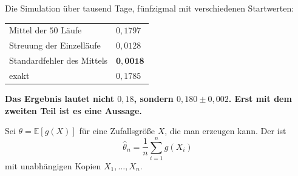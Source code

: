 \begin{merksatz}
Die Simulation über tausend Tage, fünfzigmal mit verschiedenen Startwerten:

\begin{center}
{\small
\renewcommand{\arraystretch}{1.5}
\begin{tabular}{@{}P{4.0cm}P{2.6cm}@{}}
\toprule
Mittel der $50$ Läufe & $0{,}1797$\\
Streuung der Einzelläufe & $0{,}0128$\\
Standardfehler des Mittels & $\mathbf{0{,}0018}$\\
\midrule
exakt & $0{,}1785$\\
\bottomrule
\end{tabular}}
\end{center}

\begin{center}
\begin{minipage}{0.9\textwidth}
\textbf{Das Ergebnis lautet nicht $0{,}18$, sondern $0{,}180 \pm 0{,}002$. Erst mit dem zweiten Teil ist es eine Aussage.}
\end{minipage}
\end{center}

\begin{center}
\begin{minipage}{0.88\textwidth}
\end{minipage}
\end{center}
\end{merksatz}

\begin{definition}
Sei $\theta = \mathbb{E}[g(X)]$ für eine Zufallsgröße $X$, die man erzeugen kann. Der  ist
\[ \hat\theta_n = \frac1n\sum_{i=1}^{n} g(X_i) \]
mit unabhängigen Kopien $X_1,\ldots,X_n$.
\end{definition}


